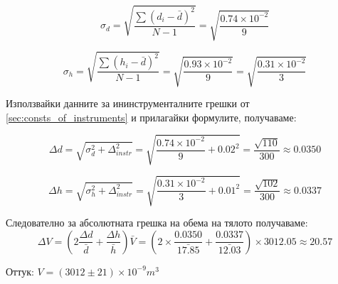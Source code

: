 \documentclass[12pt]{article}
\begin{document}
\begin{equation}
\sigma_d = \sqrt{\frac{\sum(d_i - \bar{d})^2}{N-1}} = \sqrt{\frac{0.74\times10^{-2}}{9}}
\end{equation}

\begin{equation}
\sigma_h = \sqrt{\frac{\sum(h_i - \bar{d})^2}{N-1}} = \sqrt{\frac{0.93\times10^{-2}}{9}} = \sqrt{\frac{0.31\times10^{-2}}{3}}
\end{equation}

Използвайки данните за ининструменталните грешки от \ref{sec:consts_of_instruments} и прилагайки формулите, получаваме:

\begin{equation} 
\Delta d = \sqrt{\sigma_d^2 + \Delta_{instr}^2} = \sqrt{\frac{0.74\times10^{-2}}{9} + 0.02^2} = \frac{\sqrt{110}}{300} \approx 0.0350
\end{equation} 

\begin{equation} 
\Delta h = \sqrt{\sigma_h^2 + \Delta_{instr}^2} = \sqrt{\frac{0.31\times10^{-2}}{3} + 0.01^2} = \frac{\sqrt{102}}{300} \approx 0.0337
\end{equation}

Следователно за абсолютната грешка на обема на тялото получаваме: \begin{equation}
\Delta V = (2\frac{\Delta d}{\bar{d}} + \frac{\Delta h}{\bar{h}})\bar{V} = (2\times \frac{0.0350}{\bar{17.85}} + \frac{0.0337}{\bar{12.03}})\times 3012.05 \approx 20.57
\end{equation} 

Оттук: \begin{math} V = (3012 \pm 21)\times 10^{-9} m^3\end{math}
\end{document}

